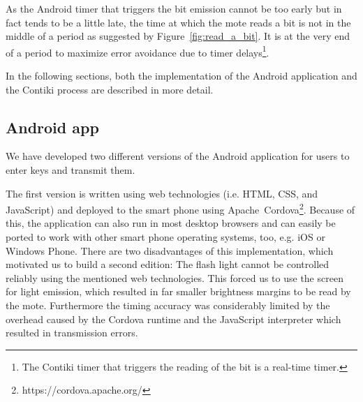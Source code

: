 \documentclass{sig-alternate} %
\begin{document}
As the Android timer that triggers the bit emission cannot be too early but in fact tends to be a little late\cite{mongia2010reliable}, the time at which the mote reads a bit is not in the middle of a period as suggested by Figure~\ref{fig:read_a_bit}.
It is at the very end of a period to maximize error avoidance due to timer delays\footnote{The Contiki timer that triggers the reading of the bit is a real-time timer.}.

In the following sections, both the implementation of the Android application and the Contiki process are described in more detail.

\subsection{Android app}
\label{sub:android_app}

We have developed two different versions of the Android application for users to enter keys and transmit them.

The first version is written using web technologies (i.e. HTML, CSS, and JavaScript) and deployed to the smart phone using Apache~Cordova\footnote{https://cordova.apache.org/}.
Because of this, the application can also run in most desktop browsers and can easily be ported to work with other smart phone operating systems, too, e.g. iOS or Windows Phone.
There are two disadvantages of this implementation, which motivated us to build a second edition:
The flash light cannot be controlled reliably using the mentioned web technologies.
This forced us to use the screen for light emission, which resulted in far smaller brightness margins to be read by the mote.
Furthermore the timing accuracy was considerably limited by the overhead caused by the Cordova runtime and the JavaScript interpreter which resulted in transmission errors.
\end{document}
